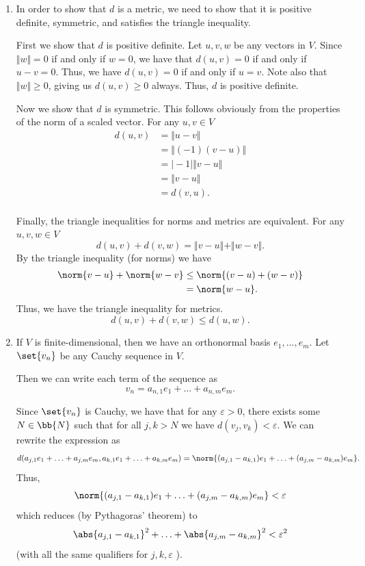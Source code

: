 \documentclass[12pt,letterpaper]{hmcpset}
\begin{document}
\begin{solution}
    \begin{enumerate}
        \item In order to show that $d$ is a metric, we need to show that it is positive definite, symmetric, and satisfies the triangle inequality.
		
        First we show that $d$ is positive definite. Let \( u, v, w \) be any vectors in $V$. Since \( \Vert w \Vert = 0 \) if and only if \( w = 0 \), we have that \( d (u, v) = 0 \) if and only if \( u - v = 0 \). Thus, we have \( d (u, v) = 0 \) if and only if \( u = v \). Note also that \( \Vert w \Vert \ge 0 \), giving us \( d(u, v) \ge 0 \) always. Thus, $d$ is positive definite. 
	
        Now we show that $d$ is symmetric. This follows obviously from the properties of the norm of a scaled vector. For any \( u, v \in V \)
        \[
        \begin{split}
		d(u, v) & = \Vert u - v \Vert \\
			& = \Vert (-1) (v - u) \Vert \\
			& = \vert -1 \vert \Vert v - u \Vert \\
			& = \Vert v - u \Vert \\
			& = d(v, u).
        \end{split}
        \]\\
        Finally, the triangle inequalities for norms and metrics are equivalent. For any \( u, v, w \in V \) 
        \[
        d(u, v) + d(v, w) = \Vert v - u \Vert + \Vert w - v \Vert.
        \]
        By the triangle inequality (for norms) we have
        \[
        	\begin{split}
			\norm{v - u} + \norm{w - v} & \le \norm{(v - u) + (w - v)} \\
						    & = \norm{w - u}.
        	\end{split}
        \]
        Thus, we have the triangle inequality for metrics.
        \[
        d(u, v) + d(v, w) \le d(u, w).
        \]
        \item If $V$ is finite-dimensional, then we have an orthonormal basis \(e_1, \ldots, e_m\). Let $\set{v_n}$ be any Cauchy sequence in $V$.
		
        Then we can write each term of the sequence as
        \[
        v_n = a_{n, 1} e_1 + \ldots + a_{n, m} e_m.
        \]
	
        Since $\set{v_n}$ is Cauchy, we have that for any \( \varepsilon > 0 \), there exists some \( N \in \bb{N} \) such that for all \( j, k > N \) we have \( d(v_j, v_k) < \varepsilon \). We can rewrite the expression as
        \[
        	d(a_{j, 1} e_1 + \ldots + a_{j, m} e_m, a_{k, 1} e_1 + \ldots + a_{k, m} e_m) = \norm{ (a_{j, 1} - a_{k, 1}) e_1 + \ldots + (a_{j, m} - a_{k, m}) e_m}.
        \]
        Thus,
        \[
	        \norm{ (a_{j, 1} - a_{k, 1}) e_1 + \ldots + (a_{j, m} - a_{k, m}) e_m} < \varepsilon
        \]
	which reduces (by Pythagoras' theorem) to
	\[
        	\abs{a_{j, 1} - a_{k, 1}}^2 + \ldots + \abs{a_{j, m} - a_{k, m}}^2 < \varepsilon^2
        \]
	(with all the same qualifiers for \( j, k, \varepsilon \) ). 


\end{enumerate}
\end{solution}
\end{document}
